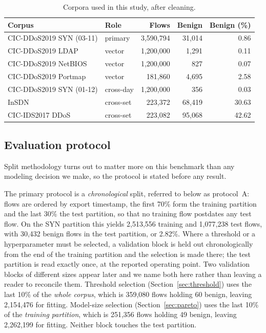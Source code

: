 \documentclass{ieeeaccess}
\begin{document}
\begin{table}[!t]
\caption{Corpora used in this study, after cleaning.}
\centering
\label{tab:dataset}
\footnotesize
\setlength{\tabcolsep}{2pt}
\renewcommand{\arraystretch}{1.2}
\begin{tabular}{@{}llrrr@{}}
\toprule
\textbf{Corpus} & \textbf{Role} & \textbf{Flows} & \textbf{Benign} & \textbf{Benign (\%)} \\
\midrule
CIC-DDoS2019 SYN (03-11) & primary    & 3,590,794 & 31,014 & 0.86 \\
CIC-DDoS2019 LDAP        & vector     & 1,200,000 & 1,291  & 0.11 \\
CIC-DDoS2019 NetBIOS     & vector     & 1,200,000 & 827    & 0.07 \\
CIC-DDoS2019 Portmap     & vector     & 181,860   & 4,695  & 2.58 \\
CIC-DDoS2019 SYN (01-12) & cross-day  & 1,200,000 & 356    & 0.03 \\
InSDN                    & cross-set  & 223,372   & 68,419 & 30.63 \\
CIC-IDS2017 DDoS         & cross-set  & 223,082   & 95,068 & 42.62 \\
\bottomrule
\end{tabular}
\end{table}

\subsection{Evaluation protocol}
\label{sec:protocol}
Split methodology turns out to matter more on this benchmark than any modeling decision we make, so the protocol is stated before any result.

The primary protocol is a \emph{chronological} split, referred to below as protocol~A: flows are ordered by export timestamp, the first 70\% form the training partition and the last 30\% the test partition, so that no training flow postdates any test flow. On the SYN partition this yields 2,513,556 training and 1,077,238 test flows, with 30,432 benign flows in the test partition, or 2.82\%. Where a threshold or a hyperparameter must be selected, a validation block is held out chronologically from the end of the training partition and the selection is made there; the test partition is read exactly once, at the reported operating point. Two validation blocks of different sizes appear later and we name both here rather than leaving a reader to reconcile them. Threshold selection (Section~\ref{sec:threshold}) uses the last 10\% of the \emph{whole corpus}, which is 359,080 flows holding 60 benign, leaving 2,154,476 for fitting. Model-size selection (Section~\ref{sec:pareto}) uses the last 10\% of the \emph{training partition}, which is 251,356 flows holding 49 benign, leaving 2,262,199 for fitting. Neither block touches the test partition.
\end{document}
